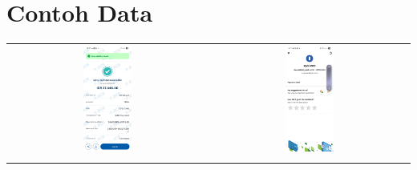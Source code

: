 \chapter{Contoh Data}
\label{chapter:contoh-data}

\begin{table}[htbp]
    \centering
    \begin{tabular}{cc}
        \includegraphics[width=0.25\textwidth]{images/contoh-data/qris-1.jpg} & \includegraphics[width=0.25\textwidth]{images/contoh-data/qris-2.jpg} \\
        \vspace{1cm}

\end{tabular}
\end{table}
